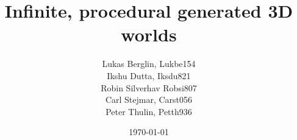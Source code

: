 \title{Infinite, procedural generated 3D worlds} %

\author{Lukas Berglin, Lukbe154\\
Ikshu Dutta, Iksdu821\\
Robin Silverhav Robsi807\\
Carl Stejmar, Carst056\\
Peter Thulin, Petth936}

\date{\today} %

\maketitle %



\clearpage